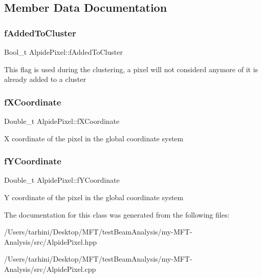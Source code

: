 \subsection{Member Data Documentation}
\mbox{\label{class_alpide_pixel_aba15cede4c878ffeccb6ad389ac37088}} 
\subsubsection{\texorpdfstring{f\+Added\+To\+Cluster}{fAddedToCluster}}
{\footnotesize\ttfamily Bool\+\_\+t Alpide\+Pixel\+::f\+Added\+To\+Cluster\hspace{0.3cm}{\ttfamily [private]}}

This flag is used during the clustering, a pixel will not considerd anymore of it is already added to a cluster \mbox{\label{class_alpide_pixel_a10324596fb2e133158add1bb476a94fe}} 
\subsubsection{\texorpdfstring{f\+X\+Coordinate}{fXCoordinate}}
{\footnotesize\ttfamily Double\+\_\+t Alpide\+Pixel\+::f\+X\+Coordinate\hspace{0.3cm}{\ttfamily [private]}}

X coordinate of the pixel in the global coordinate system \mbox{\label{class_alpide_pixel_a603313fe11571d8db63a05c26711e691}} 
\subsubsection{\texorpdfstring{f\+Y\+Coordinate}{fYCoordinate}}
{\footnotesize\ttfamily Double\+\_\+t Alpide\+Pixel\+::f\+Y\+Coordinate\hspace{0.3cm}{\ttfamily [private]}}

Y coordinate of the pixel in the global coordinate system 

The documentation for this class was generated from the following files\+:\begin{DoxyCompactItemize}
\item 
/\+Users/tarhini/\+Desktop/\+M\+F\+T/test\+Beam\+Analysis/my-\/\+M\+F\+T-\/\+Analysis/src/Alpide\+Pixel.\+hpp\item 
/\+Users/tarhini/\+Desktop/\+M\+F\+T/test\+Beam\+Analysis/my-\/\+M\+F\+T-\/\+Analysis/src/Alpide\+Pixel.\+cpp\end{DoxyCompactItemize}
